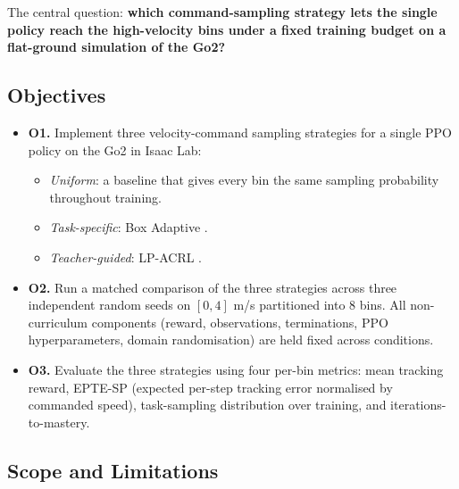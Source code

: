 The central question: \textbf{which command-sampling strategy lets the single policy reach the high-velocity bins under a fixed training budget on a flat-ground simulation of the Go2?}

\subsection{Objectives}

\begin{itemize}
  \item \textbf{O1.} Implement three velocity-command sampling strategies for a single PPO policy on the Go2 in Isaac Lab:
    \begin{itemize}
      \item \textit{Uniform}: a baseline that gives every bin the same sampling probability throughout training.
      \item \textit{Task-specific}: Box Adaptive \cite{margolis2022}.
      \item \textit{Teacher-guided}: LP-ACRL \cite{li2026}.
    \end{itemize}
  \item \textbf{O2.} Run a matched comparison of the three strategies across three independent random seeds on $[0, 4]$ m/s partitioned into $8$ bins. All non-curriculum components (reward, observations, terminations, PPO hyperparameters, domain randomisation) are held fixed across conditions.
  \item \textbf{O3.} Evaluate the three strategies using four per-bin metrics: mean tracking reward, EPTE-SP (expected per-step tracking error normalised by commanded speed), task-sampling distribution over training, and iterations-to-mastery.
\end{itemize}

\subsection{Scope and Limitations}

